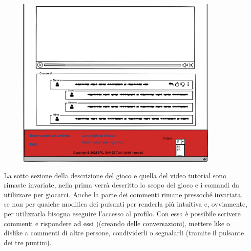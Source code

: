 \documentclass[../Report.tex]{subfiles}
\begin{document}
    \begin{figure}[H]
        \includegraphics[width=10cm]{WGioco_2.png}
        \centering
    \end{figure}

    La sotto sezione della descrizione del gioco e quella del video tutorial sono rimaste invariate, nella prima verrà descritto lo scopo del gioco e i comandi da utilizzare per giocarci. Anche la parte dei commenti rimane pressoché invariata, se non per qualche modifica dei pulsanti per renderla più intuitiva e, ovviamente, per utilizzarla bisogna eseguire l'accesso al profilo. Con essa è possibile scrivere commenti e rispondere ad essi )(creando delle conversazioni), mettere like o dislike a commenti di altre persone, condividerli o segnalarli (tramite il pulsante dei tre puntini).
\end{document}
